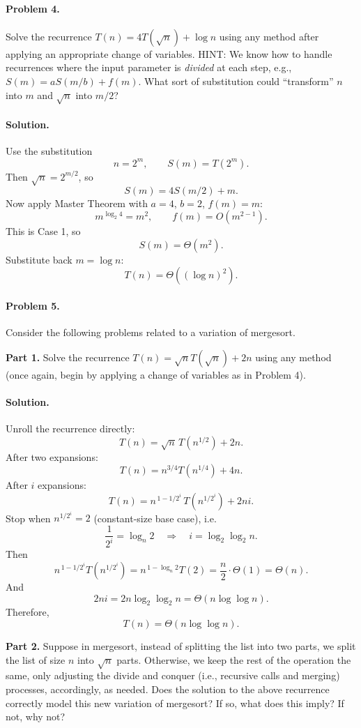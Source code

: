 \documentclass[10pt]{article}
\begin{document}
\paragraph{Problem 4.}  Solve the recurrence $T(n) = 4T(\sqrt{n}) + \log{n}$ using any method after applying an appropriate change of variables.  HINT:  We know how to handle recurrences where the input parameter is \emph{divided} at each step, e.g., $S(m) = aS(m/b) + f(m)$.  What sort of substitution could ``transform'' $n$ into $m$ and $\sqrt{n}$ into $m/2$?
\paragraph{Solution.}
Use the substitution
\[
n=2^m,\qquad S(m)=T(2^m).
\]
Then $\sqrt n=2^{m/2}$, so
\[
S(m)=4S(m/2)+m.
\]
Now apply Master Theorem with $a=4$, $b=2$, $f(m)=m$:
\[
m^{\log_2 4}=m^2,\qquad f(m)=O(m^{2-1}).
\]
This is Case 1, so
\[
S(m)=\Theta(m^2).
\]
Substitute back $m=\log n$:
\[
T(n)=\Theta((\log n)^2).
\]

\paragraph{Problem 5.}  Consider the following problems related to a variation of mergesort.


\textbf{Part 1.}  Solve the recurrence $T(n) = \sqrt{n}T(\sqrt{n}) + 2n$ using any method (once again, begin by applying a change of variables as in Problem 4). 
\paragraph{Solution.}
Unroll the recurrence directly:
\[
T(n)=\sqrt n\,T(n^{1/2})+2n.
\]
After two expansions:
\[
T(n)=n^{3/4}T(n^{1/4})+4n.
\]
After $i$ expansions:
\[
T(n)=n^{\,1-1/2^i}\,T\!\left(n^{1/2^i}\right)+2ni.
\]
Stop when $n^{1/2^i}=2$ (constant-size base case), i.e.
\[
\frac{1}{2^i}=\log_n 2 \quad\Longrightarrow\quad i=\log_2\log_2 n.
\]
Then
\[
n^{\,1-1/2^i}T\!\left(n^{1/2^i}\right)
=n^{\,1-\log_n 2}T(2)
=\frac n2\cdot \Theta(1)
=\Theta(n).
\]
And
\[
2ni=2n\log_2\log_2 n=\Theta(n\log\log n).
\]
Therefore,
\[
T(n)=\Theta(n\log\log n).
\]

\textbf{Part 2.}  Suppose in mergesort, instead of splitting the list into two parts, we split the list of size $n$ into $\sqrt{n}$ parts.  Otherwise, we keep the rest of the operation the same, only adjusting the divide and conquer (i.e., recursive calls and merging) processes, accordingly, as needed.  Does the solution to the above recurrence correctly model this new variation of mergesort?  If so, what does this imply?  If not, why not?
\end{document}
